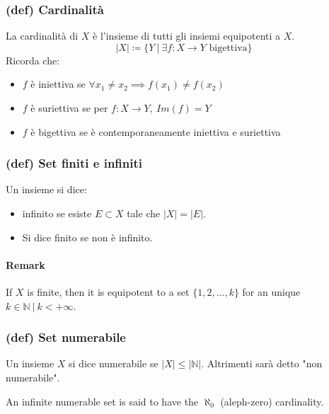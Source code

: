 \subsubsection{(def) Cardinalità}
La cardinalità di $X$ è l'insieme di tutti gli insiemi equipotenti a $X$.
$$\vert X\vert \coloneqq \{ Y\  |\  \exists f:X\to Y \text{ bigettiva}\}$$
Ricorda che:
\begin{itemize}
    \item $f$ è iniettiva se $\forall x_1\neq x_2 \implies f(x_1)\neq f(x_2)$
    \item $f$ è suriettiva se per $f:X\to Y,\ Im(f)=Y$
    \item $f$ è bigettiva se è contemporaneamente iniettiva e suriettiva
\end{itemize}
\subsubsection{(def) Set finiti e infiniti}
Un insieme si dice:
\begin{itemize}
    \item infinito se esiste $E\subset X$ tale che $|X|=|E|$.
    \item Si dice finito se non è infinito.
\end{itemize}
\paragraph{Remark} If $X$ is finite, then it is equipotent to a set $\{1,2,\dots, k\}$ for an unique $k\in \mathbb N \ | \ k<+\infty$.
\subsubsection{(def) Set numerabile}
Un insieme $X$ si dice numerabile se $|X|\le |\mathbb N|$. Altrimenti sarà detto "non numerabile".

An infinite numerable set is said to have the $\aleph_0$ (aleph-zero) cardinality.
